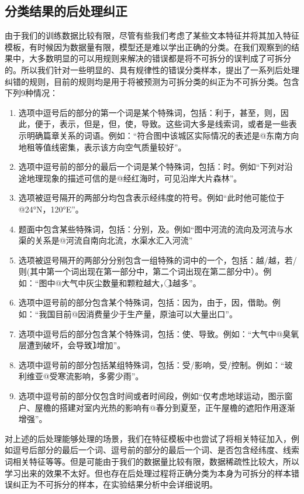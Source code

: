 \documentclass[master, winfont]{njuthesis}
\begin{document}
\subsection{分类结果的后处理纠正}
由于我们的训练数据比较有限，尽管有些我们考虑了某些文本特征并将其加入特征模板，有时候因为数据量有限，模型还是难以学出正确的分类。在我们观察到的结果中，大多数明显的可以用规则来解决的错误都是将不可拆分的误判成了可拆分的。所以我们针对一些明显的、具有规律性的错误分类样本，提出了一系列后处理纠错的规则，目前的规则均是用于将被预测为可拆分类的纠正为不可拆分类。包含下列9种情况：
\begin{enumerate}
	\item 选项中逗号后的部分的第一个词是某个特殊词，包括：利于，甚至，则，因此，便于，表示，但是，但，使，导致。这些词大多是线索词，或者是一些表示明确篇章关系的词语。例如：“符合图中该城区实际情况的表述是@东南方向地租等值线密集，表示该方向空气质量较好”。
	\item 选项中逗号前的部分的最后一个词是某个特殊词，包括：时。例如“下列对沿途地理现象的描述可信的是@经红海时，可见沿岸大片森林”。
	\item 选项被逗号隔开的两部分均包含表示经纬度的符号。例如“此时他可能位于@24°N，120°E”。
	\item 题面中包含某些特殊词，包括：分别，及。例如“图中河流的流向及河流与水渠的关系是@河流自南向北流，水渠水汇入河流”
	\item 选项被逗号隔开的两部分分别包含一组特殊的词中的一个，包括：越/越，若/则(其中第一个词出现在第一部分中，第二个词出现在第二部分中）。例如：“图中@大气中灰尘数量和颗粒越大，\textcircled{1}越多”。
	\item 选项中逗号前的部分包含某个特殊词，包括：因为，由于，因，借助。例如：“我国目前@因消费量少于生产量，原油可以大量出口”。
	\item 选项中逗号后的部分包含某个特殊词，包括：使、导致。例如：“大气中@臭氧层遭到破坏，会导致\textcircled{1}增加”。
	\item 选项中逗号前的部分包括某组特殊词，包括：受/影响，受/控制。例如：“玻利维亚@受寒流影响，多雾少雨”。
	\item 选项中逗号前的部分仅包含时间或者时间段，例如“仅考虑地球运动，图示窗户、屋檐的搭建对室内光热的影响有@春分到夏至，正午屋檐的遮阳作用逐渐增强”。
\end{enumerate}

对上述的后处理能够处理的场景，我们在特征模板中也尝试了将相关特征加入，例如逗号后部分的最后一个词、逗号前的部分的最后一个词、是否包含经纬度、线索词相关特征等等。但是可能由于我们的数据量比较有限，数据稀疏性比较大，所以学习出来的效果不太好。但也存在后处理过程将正确分类为本身为可拆分的样本错误纠正为不可拆分的样本，在实验结果分析中会详细说明。
\end{document}
